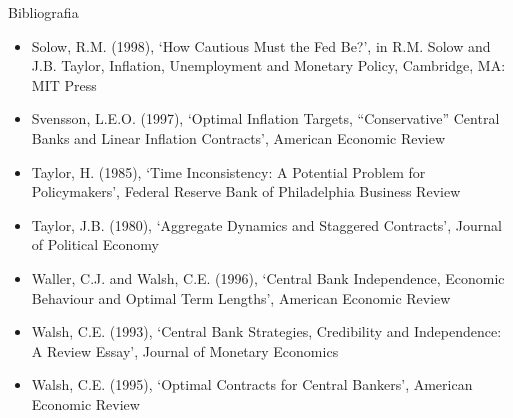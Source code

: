 \documentclass[10pt]{beamer}
\begin{document}
\begin{frame}{ Bibliografia}
    \begin{itemize}                        
        \item Solow, R.M. (1998), ‘How Cautious Must the Fed Be?’, in R.M. Solow and J.B. Taylor, Inflation, Unemployment and Monetary Policy, Cambridge, MA: MIT Press\medskip        
        \item Svensson, L.E.O. (1997), ‘Optimal Inflation Targets, “Conservative” Central Banks and Linear Inflation Contracts’, American Economic Review\medskip
        \item Taylor, H. (1985), ‘Time Inconsistency: A Potential Problem for Policymakers’, Federal Reserve Bank of Philadelphia Business Review\medskip
        \item Taylor, J.B. (1980), ‘Aggregate Dynamics and Staggered Contracts’, Journal of Political Economy\medskip
        \item Waller, C.J. and Walsh, C.E. (1996), ‘Central Bank Independence, Economic Behaviour and Optimal Term Lengths’, American Economic Review\medskip
        \item Walsh, C.E. (1993), ‘Central Bank Strategies, Credibility and Independence: A Review Essay’, Journal of Monetary Economics\medskip
        \item Walsh, C.E. (1995), ‘Optimal Contracts for Central Bankers’, American Economic Review\medskip
    \end{itemize}
\end{frame}
\end{document}
